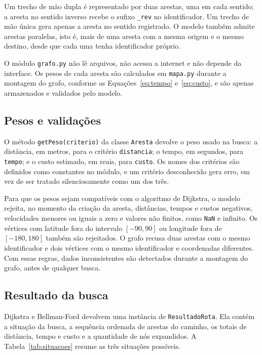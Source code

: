 \documentclass[12pt]{article}
\begin{document}
Um trecho de mão dupla é representado por duas arestas, uma em cada
sentido; a aresta no sentido inverso recebe o sufixo \texttt{\_rev} no
identificador. Um trecho de mão única gera apenas a aresta no sentido
registrado. O modelo também admite arestas paralelas, isto é, mais de
uma aresta com a mesma origem e o mesmo destino, desde que cada uma
tenha identificador próprio.

O módulo \texttt{grafo.py} não lê arquivos, não acessa a internet e não
depende da interface. Os pesos de cada aresta são calculados em
\texttt{mapa.py} durante a montagem do grafo, conforme as
Equações~\ref{eq:tempo} e~\ref{eq:custo}, e são apenas armazenados e
validados pelo modelo.

\subsection{Pesos e validações}
\label{subsec:pesos-validacoes}

O método \texttt{getPeso(criterio)} da classe \texttt{Aresta} devolve o
peso usado na busca: a distância, em metros, para o critério
\texttt{distancia}; o tempo, em segundos, para \texttt{tempo}; e o custo
estimado, em reais, para \texttt{custo}. Os nomes dos critérios são
definidos como constantes no módulo, e um critério desconhecido gera
erro, em vez de ser tratado silenciosamente como um dos três.

Para que os pesos sejam compatíveis com o algoritmo de Dijkstra, o
modelo rejeita, no momento da criação da aresta, distâncias, tempos e
custos negativos, velocidades menores ou iguais a zero e valores não
finitos, como \texttt{NaN} e infinito. Os vértices com latitude fora do
intervalo $[-90, 90]$ ou longitude fora de $[-180, 180]$ também são
rejeitados. O grafo recusa duas arestas com o mesmo identificador e
dois vértices com o mesmo identificador e coordenadas diferentes. Com
essas regras, dados inconsistentes são detectados durante a montagem do
grafo, antes de qualquer busca.

\subsection{Resultado da busca}
\label{subsec:resultado-busca}

Dijkstra e Bellman-Ford devolvem uma instância de
\texttt{ResultadoRota}. Ela contém a situação da busca, a sequência
ordenada de arestas do caminho, os totais de distância, tempo e custo e
a quantidade de nós expandidos. A Tabela~\ref{tab:situacoes} resume as
três situações possíveis.
\end{document}
